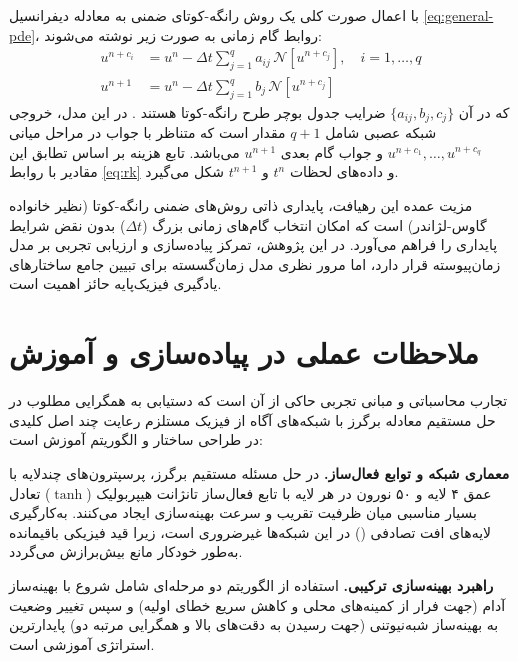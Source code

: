 با اعمال صورت کلی یک روش رانگه-کوتای ضمنی به معادله دیفرانسیل \eqref{eq:general-pde}، روابط گام زمانی به صورت زیر نوشته می‌شوند:
\begin{equation}
\begin{aligned}
u^{n+c_i} &= u^n - \Delta t \sum_{j=1}^{q} a_{ij}\, \mathcal{N}[u^{n+c_j}], \quad i=1,\dots,q \\
u^{n+1} &= u^n - \Delta t \sum_{j=1}^{q} b_j\, \mathcal{N}[u^{n+c_j}]
\end{aligned}
\label{eq:rk}
\end{equation}
که در آن $\{a_{ij}, b_j, c_j\}$ ضرایب جدول بوچر طرح رانگه-کوتا هستند \cite{butcher2016}. در این مدل، خروجی شبکه عصبی شامل $q+1$ مقدار است که متناظر با جواب در مراحل میانی $u^{n+c_1},\dots,u^{n+c_q}$ و جواب گام بعدی $u^{n+1}$ می‌باشد. تابع هزینه بر اساس تطابق این مقادیر با روابط \eqref{eq:rk} و داده‌های لحظات $t^n$ و $t^{n+1}$ شکل می‌گیرد.

مزیت عمده این رهیافت، پایداری ذاتی روش‌های ضمنی رانگه-کوتا (نظیر خانواده گاوس-لژاندر) است که امکان انتخاب گام‌های زمانی بزرگ ($\Delta t$) بدون نقض شرایط پایداری را فراهم می‌آورد. در این پژوهش، تمرکز پیاده‌سازی و ارزیابی تجربی بر مدل زمان‌پیوسته قرار دارد، اما مرور نظری مدل زمان‌گسسته برای تبیین جامع ساختارهای یادگیری فیزیک‌پایه حائز اهمیت است.

\section{ملاحظات عملی در پیاده‌سازی و آموزش}
\label{sec:practical}

تجارب محاسباتی و مبانی تجربی حاکی از آن است که دستیابی به همگرایی مطلوب در حل مستقیم معادله برگرز با شبکه‌های آگاه از فیزیک مستلزم رعایت چند اصل کلیدی در طراحی ساختار و الگوریتم آموزش است:

\textbf{معماری شبکه و توابع فعال‌ساز.} در حل مسئله مستقیم برگرز، پرسپترون‌های چندلایه با عمق ۴ لایه و ۵۰ نورون در هر لایه با تابع فعال‌ساز تانژانت هیپربولیک ($\tanh$) تعادل بسیار مناسبی میان ظرفیت تقریب و سرعت بهینه‌سازی ایجاد می‌کنند. به‌کارگیری لایه‌های افت تصادفی () در این شبکه‌ها غیرضروری است، زیرا قید فیزیکی باقیمانده به‌طور خودکار مانع بیش‌برازش می‌گردد.

\textbf{راهبرد بهینه‌سازی ترکیبی.} استفاده از الگوریتم دو مرحله‌ای شامل شروع با بهینه‌ساز آدام (جهت فرار از کمینه‌های محلی و کاهش سریع خطای اولیه) و سپس تغییر وضعیت به بهینه‌ساز شبه‌نیوتنی  (جهت رسیدن به دقت‌های بالا و همگرایی مرتبه دو) پایدارترین استراتژی آموزشی است.

